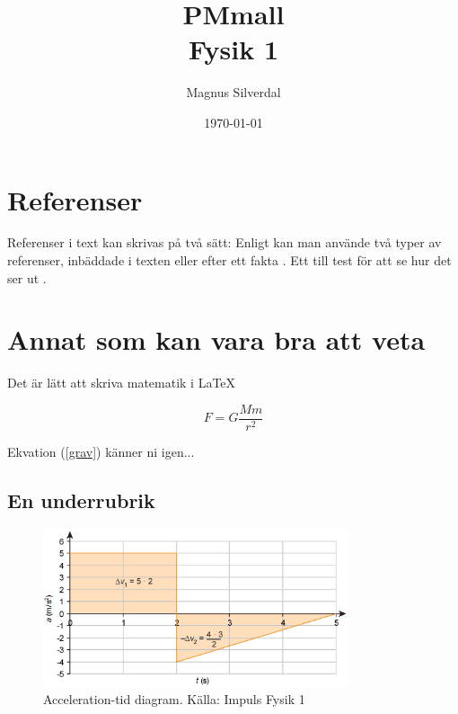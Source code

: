\documentclass[11p]{article}
\title{PMmall \\ \small Fysik 1}
\author{Magnus Silverdal }
\date{\today}
\begin{document}
\maketitle

\section{Referenser}
Referenser i text kan skrivas på två sätt: Enligt \textcite{Jens} kan man använde två typer av referenser, inbäddade i texten eller efter ett fakta \parencite{Fraenkel}. Ett till test för att se hur det ser ut \parencite{fermi}.



\section{Annat som kan vara bra att veta}
Det är lätt att skriva matematik i \LaTeX

\begin{equation}
    F = G \frac{M m}{r^2}
    \label{grav}
\end{equation}

Ekvation (\ref{grav}) känner ni igen...

\subsection{En underrubrik}
\begin{figure}[!h]
            \includegraphics[width=0.8\textwidth]{accelerationTime.png}
            \caption{Acceleration-tid diagram. Källa: Impuls Fysik 1}
        \end{figure}
\printbibliography
\end{document}
